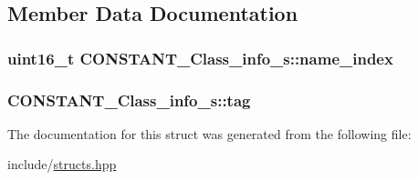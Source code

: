 \subsection{Member Data Documentation}
\hypertarget{structCONSTANT__Class__info__s_a3e852021d398529ee470dc916998fa6a}{
\subsubsection[{name\+\_\+index}]{\setlength{\rightskip}{0pt plus 5cm}uint16\+\_\+t C\+O\+N\+S\+T\+A\+N\+T\+\_\+\+Class\+\_\+info\+\_\+s\+::name\+\_\+index}}\label{structCONSTANT__Class__info__s_a3e852021d398529ee470dc916998fa6a}
\hypertarget{structCONSTANT__Class__info__s_ae27fd46fb88a7d58404f0d0b29babc3e}{
\subsubsection[{tag}]{ C\+O\+N\+S\+T\+A\+N\+T\+\_\+\+Class\+\_\+info\+\_\+s\+::tag}}\label{structCONSTANT__Class__info__s_ae27fd46fb88a7d58404f0d0b29babc3e}


The documentation for this struct was generated from the following file\+:\begin{DoxyCompactItemize}
\item 
include/\hyperlink{structs_8hpp}{structs.\+hpp}\end{DoxyCompactItemize}
